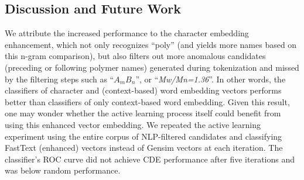 \subsection{Discussion and Future Work}
\label{sec:discussion}
We attribute the increased performance to the character embedding enhancement, which not only recognizes ``poly'' (and yields more names based on this n-gram comparison), but also filters out more anomalous candidates (preceding or following polymer names) generated during tokenization and missed by the filtering steps such as ``\textit{$A_mB_n$}'', or ``\textit{Mw/Mn=1.36}''.  
In other words, the classifiers of character and (context-based) word embedding vectors performs better than classifiers of only context-based word embedding.
Given this result, one may wonder whether the active learning process itself could benefit from using this enhanced vector embedding. 
We repeated the active learning experiment using the entire corpus of NLP-filtered candidates and classifying FastText (enhanced) vectors instead of Gensim vectors at each iteration. 
The classifier's ROC curve did not achieve CDE performance after five iterations and was below random performance.%

